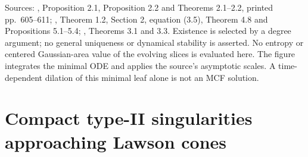 \begin{example}
Sources: \cite{CatVelazquez1994}, Proposition 2.1, Proposition 2.2 and Theorems 2.1--2.2, printed pp.~605--611; \cite{CatGuoSesum2018}, Theorem 1.2, Section 2, equation (3.5), Theorem 4.8 and Propositions 5.1--5.4; \cite{CatStolarski2023}, Theorems 3.1 and 3.3. Existence is selected by a degree argument; no general uniqueness or dynamical stability is asserted. No entropy or centered Gaussian-area value of the evolving slices is evaluated here. The figure integrates the minimal ODE and applies the source's asymptotic scales. A time-dependent dilation of this minimal leaf alone is not an MCF solution.
\end{example}

\chapter{Compact type-II singularities approaching Lawson cones}\label{sec:catalogue-compact-lawson-cone-flows}
